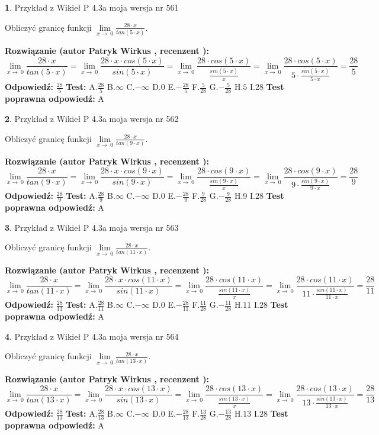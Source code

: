 \documentclass[12pt, a4paper]{article}
\theoremstyle{definition} %
\newtheorem{zad}{}
\newcommand{\zadStart}[1]{\begin{zad}#1\newline}
\newcommand{\zadStop}{\end{zad}}
\newcommand{\rozwStart}[2]{\noindent \textbf{Rozwiązanie (autor #1 , recenzent #2): }\newline}
\newcommand{\rozwStop}{\newline}
\newcommand{\odpStart}{\noindent \textbf{Odpowiedź:}\newline}
\newcommand{\odpStop}{\newline}
\newcommand{\testStart}{\noindent \textbf{Test:}\newline}
\newcommand{\testStop}{\newline}
\newcommand{\kluczStart}{\noindent \textbf{Test poprawna odpowiedź:}\newline}
\newcommand{\kluczStop}{\newline}
\begin{document}
\zadStart{Przykład z Wikieł P 4.3a moja wersja nr 561}


Obliczyć granicę funkcji $\lim\limits_{x\to\ 0}\frac{28 \cdot x}{tan(5 \cdot x)}$.
\zadStop
\rozwStart{Patryk Wirkus}{}
$$\lim\limits_{x\to\ 0}\frac{28 \cdot x}{tan(5 \cdot x)}=\lim\limits_{x\to\ 0}\frac{28 \cdot x \cdot cos(5 \cdot x)}{sin(5 \cdot x)}=\lim\limits_{x\to\ 0}\frac{28 \cdot cos(5 \cdot x)}{\frac{sin(5 \cdot x)}{x}}=\lim\limits_{x\to\ 0}\frac{28 \cdot cos(5 \cdot x)}{5 \cdot \frac{sin(5 \cdot x)}{5 \cdot x}} = \frac{28}{5}$$
\rozwStop
\odpStart
$\frac{28}{5}$
\odpStop
\testStart
A.$\frac{28}{5}$
B.$\infty$
C.$-\infty$
D.$0$
E.$-\frac{28}{5}$
F.$\frac{5}{28}$
G.$-\frac{5}{28}$
H.$5$
I.$28$
\testStop
\kluczStart
A
\kluczStop



\zadStart{Przykład z Wikieł P 4.3a moja wersja nr 562}


Obliczyć granicę funkcji $\lim\limits_{x\to\ 0}\frac{28 \cdot x}{tan(9 \cdot x)}$.
\zadStop
\rozwStart{Patryk Wirkus}{}
$$\lim\limits_{x\to\ 0}\frac{28 \cdot x}{tan(9 \cdot x)}=\lim\limits_{x\to\ 0}\frac{28 \cdot x \cdot cos(9 \cdot x)}{sin(9 \cdot x)}=\lim\limits_{x\to\ 0}\frac{28 \cdot cos(9 \cdot x)}{\frac{sin(9 \cdot x)}{x}}=\lim\limits_{x\to\ 0}\frac{28 \cdot cos(9 \cdot x)}{9 \cdot \frac{sin(9 \cdot x)}{9 \cdot x}} = \frac{28}{9}$$
\rozwStop
\odpStart
$\frac{28}{9}$
\odpStop
\testStart
A.$\frac{28}{9}$
B.$\infty$
C.$-\infty$
D.$0$
E.$-\frac{28}{9}$
F.$\frac{9}{28}$
G.$-\frac{9}{28}$
H.$9$
I.$28$
\testStop
\kluczStart
A
\kluczStop



\zadStart{Przykład z Wikieł P 4.3a moja wersja nr 563}


Obliczyć granicę funkcji $\lim\limits_{x\to\ 0}\frac{28 \cdot x}{tan(11 \cdot x)}$.
\zadStop
\rozwStart{Patryk Wirkus}{}
$$\lim\limits_{x\to\ 0}\frac{28 \cdot x}{tan(11 \cdot x)}=\lim\limits_{x\to\ 0}\frac{28 \cdot x \cdot cos(11 \cdot x)}{sin(11 \cdot x)}=\lim\limits_{x\to\ 0}\frac{28 \cdot cos(11 \cdot x)}{\frac{sin(11 \cdot x)}{x}}=\lim\limits_{x\to\ 0}\frac{28 \cdot cos(11 \cdot x)}{11 \cdot \frac{sin(11 \cdot x)}{11 \cdot x}} = \frac{28}{11}$$
\rozwStop
\odpStart
$\frac{28}{11}$
\odpStop
\testStart
A.$\frac{28}{11}$
B.$\infty$
C.$-\infty$
D.$0$
E.$-\frac{28}{11}$
F.$\frac{11}{28}$
G.$-\frac{11}{28}$
H.$11$
I.$28$
\testStop
\kluczStart
A
\kluczStop



\zadStart{Przykład z Wikieł P 4.3a moja wersja nr 564}


Obliczyć granicę funkcji $\lim\limits_{x\to\ 0}\frac{28 \cdot x}{tan(13 \cdot x)}$.
\zadStop
\rozwStart{Patryk Wirkus}{}
$$\lim\limits_{x\to\ 0}\frac{28 \cdot x}{tan(13 \cdot x)}=\lim\limits_{x\to\ 0}\frac{28 \cdot x \cdot cos(13 \cdot x)}{sin(13 \cdot x)}=\lim\limits_{x\to\ 0}\frac{28 \cdot cos(13 \cdot x)}{\frac{sin(13 \cdot x)}{x}}=\lim\limits_{x\to\ 0}\frac{28 \cdot cos(13 \cdot x)}{13 \cdot \frac{sin(13 \cdot x)}{13 \cdot x}} = \frac{28}{13}$$
\rozwStop
\odpStart
$\frac{28}{13}$
\odpStop
\testStart
A.$\frac{28}{13}$
B.$\infty$
C.$-\infty$
D.$0$
E.$-\frac{28}{13}$
F.$\frac{13}{28}$
G.$-\frac{13}{28}$
H.$13$
I.$28$
\testStop
\kluczStart
A
\kluczStop
\end{document}
